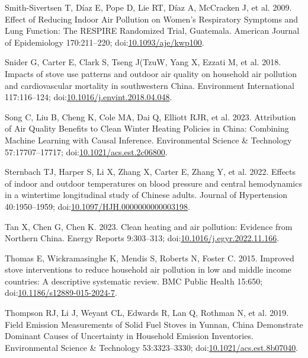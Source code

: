 \documentclass[
  letterpaper,
  DIV=11,
  numbers=noendperiod]{scrartcl}
\newlength{\cslhangindent}
\newlength{\cslentryspacingunit} %
\newenvironment{CSLReferences}[2] %
 {%
  \setlength{\parindent}{0pt}
  \ifodd #1
  \let\oldpar\par
  \def\par{\hangindent=\cslhangindent\oldpar}
  \fi
  \setlength{\parskip}{#2\cslentryspacingunit}
 }%
 {}
\begin{document}
\begin{CSLReferences}{1}{0}
\leavevmode{}%
Smith-Sivertsen T, Díaz E, Pope D, Lie RT, Díaz A, McCracken J, et al.
2009. Effect of {Reducing Indoor Air Pollution} on {Women}'s
{Respiratory Symptoms} and {Lung Function}: {The RESPIRE Randomized
Trial}, {Guatemala}. American Journal of Epidemiology 170:211--220;
doi:\href{https://doi.org/10.1093/aje/kwp100}{10.1093/aje/kwp100}.

\leavevmode{}%
Snider G, Carter E, Clark S, Tseng J(TzuW, Yang X, Ezzati M, et al.
2018. Impacts of stove use patterns and outdoor air quality on household
air pollution and cardiovascular mortality in southwestern {China}.
Environment International 117:116--124;
doi:\href{https://doi.org/10.1016/j.envint.2018.04.048}{10.1016/j.envint.2018.04.048}.

\leavevmode{}%
Song C, Liu B, Cheng K, Cole MA, Dai Q, Elliott RJR, et al. 2023.
Attribution of {Air Quality Benefits} to {Clean Winter Heating Policies}
in {China}: {Combining Machine Learning} with {Causal Inference}.
Environmental Science \& Technology 57:17707--17717;
doi:\href{https://doi.org/10.1021/acs.est.2c06800}{10.1021/acs.est.2c06800}.

\leavevmode{}%
Sternbach TJ, Harper S, Li X, Zhang X, Carter E, Zhang Y, et al. 2022.
Effects of indoor and outdoor temperatures on blood pressure and central
hemodynamics in a wintertime longitudinal study of {Chinese} adults.
Journal of Hypertension 40:1950--1959;
doi:\href{https://doi.org/10.1097/HJH.0000000000003198}{10.1097/HJH.0000000000003198}.

\leavevmode{}%
Tan X, Chen G, Chen K. 2023. Clean heating and air pollution: {Evidence}
from {Northern China}. Energy Reports 9:303--313;
doi:\href{https://doi.org/10.1016/j.egyr.2022.11.166}{10.1016/j.egyr.2022.11.166}.

\leavevmode{}%
Thomas E, Wickramasinghe K, Mendis S, Roberts N, Foster C. 2015.
Improved stove interventions to reduce household air pollution in low
and middle income countries: A descriptive systematic review. BMC Public
Health 15:650;
doi:\href{https://doi.org/10.1186/s12889-015-2024-7}{10.1186/s12889-015-2024-7}.

\leavevmode{}%
Thompson RJ, Li J, Weyant CL, Edwards R, Lan Q, Rothman N, et al. 2019.
Field {Emission Measurements} of {Solid Fuel Stoves} in {Yunnan}, {China
Demonstrate Dominant Causes} of {Uncertainty} in {Household Emission
Inventories}. Environmental Science \& Technology 53:3323--3330;
doi:\href{https://doi.org/10.1021/acs.est.8b07040}{10.1021/acs.est.8b07040}.


\end{CSLReferences}
\end{document}
